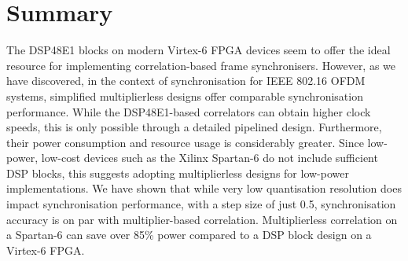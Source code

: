 \section{Summary}
The DSP48E1 blocks on modern Virtex-6 FPGA devices seem to offer the ideal resource for implementing correlation-based frame synchronisers.
However, as we have discovered, in the context of synchronisation for IEEE 802.16 OFDM systems, simplified multiplierless designs offer comparable synchronisation performance.
While the DSP48E1-based correlators can obtain higher clock speeds, this is only possible through a detailed pipelined design.
Furthermore, their power consumption and resource usage is considerably greater.
Since low-power, low-cost devices such as the Xilinx Spartan-6 do not include sufficient DSP blocks, this suggests adopting multiplierless designs for low-power implementations.
We have shown that while very low quantisation resolution does impact synchronisation performance, with a step size of just 0.5, synchronisation accuracy is on par with multiplier-based correlation.
Multiplierless correlation on a Spartan-6 can save over 85\% power compared to a DSP block design on a Virtex-6 FPGA.